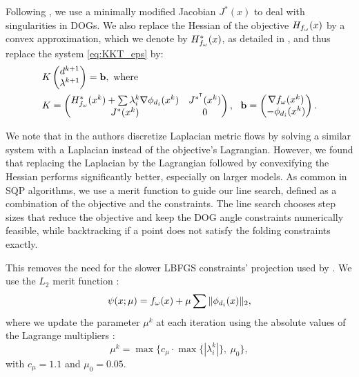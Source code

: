Following \cite{rabi2018shape}, we use a minimally modified Jacobian $J^*(x)$ to deal with singularities in DOGs. We also replace the Hessian of the objective $H_{f_\omega}(x)$ by a convex approximation, which we denote by $H^*_{f_\omega}(x)$, as detailed in , and thus replace the system \eqref{eq:KKT_eps} by:
%
\begin{align} 
\label{eq:linear_system}
&{K} \begin{pmatrix} d^{k+1} \\ \lambda^{k+1} \end{pmatrix}=\mathbf{b}, \ \text{where} \\
\nonumber
&{K}=\begin{pmatrix}
{ H^*_{f_\omega}(\x^k)+\sum\lambda_i^{k} \nabla \phi_{d_i}(\x^k)} & {J^{*^\tr}(\x^k)}\\
{J^*(\x^k)} &  0 \\
\end{pmatrix}, \ \ 
\mathbf{b}=\begin{pmatrix}
{\nabla f_\omega(x^k)} \\ 
-\phi_{d_i}(x^k)\\
\end{pmatrix}.
\end{align}

We note that in \cite{rabi2018shape} the authors discretize Laplacian metric flows by solving a similar system with a Laplacian instead of the objective's Lagrangian. However, we found that replacing the Laplacian by the Lagrangian followed by convexifying the Hessian performs significantly better, especially on larger models. As common in SQP algorithms, we use a merit function to guide our line search, defined as a combination of the objective and the constraints. The line search chooses step sizes that reduce the objective and keep the DOG angle constraints numerically feasible, while backtracking if a point does not satisfy the folding constraints exactly.

This removes the need for the slower LBFGS constraints' projection used by \cite{rabi18,rabi2018shape}. We use the $L_2$ merit function \cite{nocedal}:
\begin{equation}
\psi(x;\mu) = f_\omega(x)+\mu\sum\|\phi_{d_i}(x)\|_2,
\end{equation}
where we update the parameter $\mu^k$ at each iteration using the absolute values of the Lagrange multipliers \cite{nocedal}:
\begin{equation}
\mu^k = \max\{c_\mu \cdot \max\{|{\lambda_i^k}|\},\ \mu_0\},
\end{equation}
with $c_\mu = 1.1$ and $\mu_0 = 0.05$.

